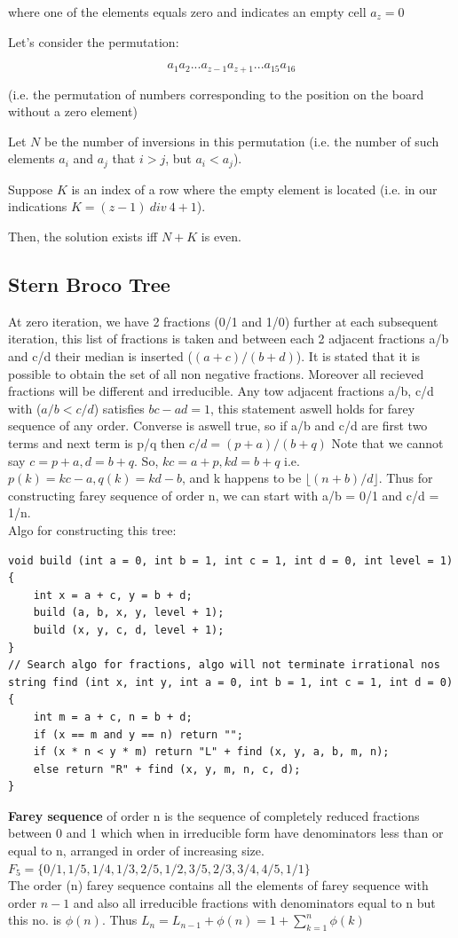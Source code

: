 \documentclass[8pt, a4paper, oneside, twocolumn]{extarticle}
\begin{document}
where one of the elements equals zero and indicates an empty cell $a_z = 0$

Let’s consider the permutation:

$$a_1 a_2 ... a_{z-1} a_{z+1} ... a_{15} a_{16}$$

(i.e. the permutation of numbers corresponding to the position on the board without a zero element)

Let $N$ be the number of inversions in this permutation (i.e. the number of such elements $a_i$ and $a_j$ that $i > j$, but $a_i < a_j$).

Suppose $K$ is an index of a row where the empty element is located (i.e. in our indications $K = (z - 1) \ div \ 4 + 1$).

Then, the solution exists iff $N + K$ is even.
\subsection{Stern Broco Tree}
At zero iteration, we have 2 fractions (0/1 and 1/0) further at each subsequent iteration, this list of fractions is taken and between each 2 adjacent fractions a/b and c/d their median is inserted ($(a+c)/(b+d)$). It is stated that it is possible to obtain the set of all non negative fractions. Moreover all recieved fractions will be different and irreducible. Any tow adjacent fractions a/b, c/d with ($a/b < c/d$) satisfies $bc - ad = 1$, this statement aswell holds for farey sequence of any order. Converse is aswell true, so if a/b and c/d are first two terms and next term is p/q then $c/d = (p + a)/(b + q)$ Note that we cannot say $c = p + a, d = b + q$. So, $kc = a + p, kd = b + q$ i.e. $p(k) = kc - a, q(k) = kd - b$, and k happens to be $\lfloor(n + b)/d\rfloor$. Thus for constructing farey sequence of order n, we can start with a/b = 0/1 and c/d = 1/n.
\\Algo for constructing this tree:
\begin{verbatim}
void build (int a = 0, int b = 1, int c = 1, int d = 0, int level = 1) {
    int x = a + c, y = b + d;
    build (a, b, x, y, level + 1);
    build (x, y, c, d, level + 1);
}
// Search algo for fractions, algo will not terminate irrational nos
string find (int x, int y, int a = 0, int b = 1, int c = 1, int d = 0) {
    int m = a + c, n = b + d;
    if (x == m and y == n) return "";
    if (x * n < y * m) return "L" + find (x, y, a, b, m, n);
    else return "R" + find (x, y, m, n, c, d);
}
\end{verbatim} 
\textbf{Farey sequence} of order n is the sequence of completely reduced fractions between 0 and 1 which when in irreducible form have denominators less than or equal to n, arranged in order of increasing size. $F_5 = \{0/1, 1/5, 1/4, 1/3, 2/5, 1/2, 3/5, 2/3, 3/4, 4/5, 1/1\}$
\\The order (n) farey sequence contains all the elements of farey sequence with order $n - 1$ and also all irreducible fractions with denominators equal to n but this no. is $\phi(n)$. Thus $L_n = L_{n - 1} + \phi(n) = 1 + \sum_{k = 1}^n \phi(k)$
\end{document}
